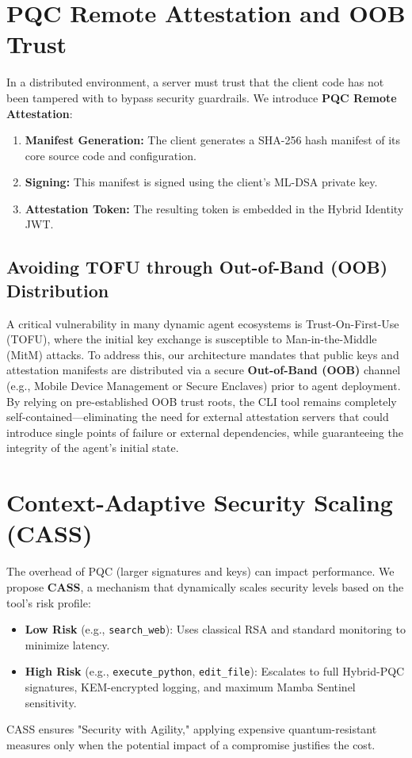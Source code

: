 \documentclass[conference]{IEEEtran}
\begin{document}
\section{PQC Remote Attestation and OOB Trust}
In a distributed environment, a server must trust that the client code has not been tampered with to bypass security guardrails. We introduce \textbf{PQC Remote Attestation}:
\begin{enumerate}
    \item \textbf{Manifest Generation:} The client generates a SHA-256 hash manifest of its core source code and configuration.
    \item \textbf{Signing:} This manifest is signed using the client's ML-DSA private key.
    \item \textbf{Attestation Token:} The resulting token is embedded in the Hybrid Identity JWT.
\end{enumerate}

\subsection{Avoiding TOFU through Out-of-Band (OOB) Distribution}
A critical vulnerability in many dynamic agent ecosystems is Trust-On-First-Use (TOFU), where the initial key exchange is susceptible to Man-in-the-Middle (MitM) attacks. To address this, our architecture mandates that public keys and attestation manifests are distributed via a secure \textbf{Out-of-Band (OOB)} channel (e.g., Mobile Device Management or Secure Enclaves) prior to agent deployment. By relying on pre-established OOB trust roots, the CLI tool remains completely self-contained—eliminating the need for external attestation servers that could introduce single points of failure or external dependencies, while guaranteeing the integrity of the agent's initial state.

\section{Context-Adaptive Security Scaling (CASS)}
The overhead of PQC (larger signatures and keys) can impact performance. We propose \textbf{CASS}, a mechanism that dynamically scales security levels based on the tool's risk profile:
\begin{itemize}
    \item \textbf{Low Risk} (e.g., \texttt{search\_web}): Uses classical RSA and standard monitoring to minimize latency.
    \item \textbf{High Risk} (e.g., \texttt{execute\_python}, \texttt{edit\_file}): Escalates to full Hybrid-PQC signatures, KEM-encrypted logging, and maximum Mamba Sentinel sensitivity.
\end{itemize}
CASS ensures "Security with Agility," applying expensive quantum-resistant measures only when the potential impact of a compromise justifies the cost.
\end{document}
